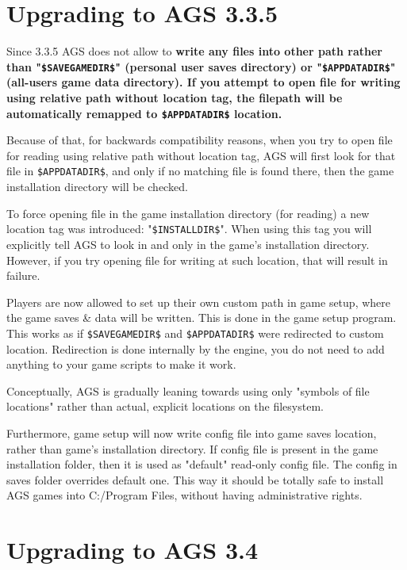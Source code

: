 \chapter{Upgrading to AGS 3.3.5}\label{UpgradeTo335}%

Since 3.3.5 AGS does not allow to \bf{write} any files into other path rather than "\verb^$SAVEGAMEDIR$^"
(personal user saves directory) or "\verb^$APPDATADIR$^" (all-users game data directory). If you attempt to open
file for \bf{writing} using relative path without location tag, the filepath will be automatically remapped to
\verb^$APPDATADIR$^ location.

Because of that, for backwards compatibility reasons, when you try to open file for reading using relative path
without location tag, AGS will first look for that file in \verb^$APPDATADIR$^, and only if no matching file is
found there, then the game installation directory will be checked.

To force opening file in the game installation directory (for reading) a new location tag was introduced: 
"\verb^$INSTALLDIR$^". When using this tag you will explicitly tell AGS to look in and only in the game's
installation directory. However, if you try opening file for writing at such location, that will result in
failure.

Players are now allowed to set up their own custom path in game setup, where the game
saves & data will be written. This is done in the game setup program.
This works as if \verb^$SAVEGAMEDIR$^ and \verb^$APPDATADIR$^ were redirected to custom location.
Redirection is done internally by the engine, you do not need to add anything to your game scripts to make it work.

Conceptually, AGS is gradually leaning towards using only "symbols of file locations" rather than actual,
explicit locations on the filesystem.

Furthermore, game setup will now write config file into game saves location, rather than game's installation directory.
If config file is present in the game installation folder, then it is used as "default" read-only config file.
The config in saves folder overrides default one.
This way it should be totally safe to install AGS games into C:/Program Files, without having administrative rights.


\chapter{Upgrading to AGS 3.4}\label{UpgradeTo34}%

